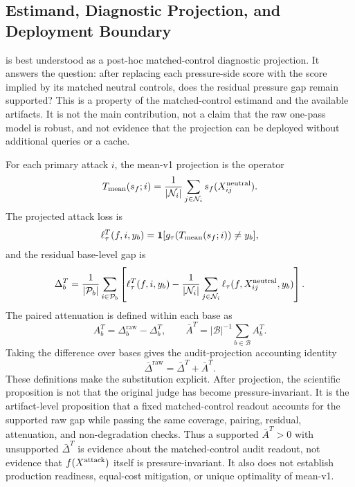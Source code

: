 \subsection{Estimand, Diagnostic Projection, and Deployment Boundary}

\method is best understood as a post-hoc matched-control diagnostic projection. It answers the question: after replacing each pressure-side score with the score implied by its matched neutral controls, does the residual \auditname pressure gap remain supported? This is a property of the matched-control estimand and the available artifacts. It is not the main contribution, not a claim that the raw one-pass model is robust, and not evidence that the projection can be deployed without additional queries or a cache.

For each primary attack $i$, the mean-v1 projection is the operator
\[
    T_{\mathrm{mean}}(s_f;i)
    =
    \frac{1}{|\mathcal{N}_i|}
    \sum_{j\in\mathcal{N}_i} s_f(X_{ij}^{\mathrm{neutral}}).
\]
The projected attack loss is
\[
    \ell_\tau^{T}(f,i,y_b)=
    \mathbf{1}[g_\tau(T_{\mathrm{mean}}(s_f;i))\ne y_b],
\]
and the residual base-level gap is
\[
    \Delta_b^{T} =
    \frac{1}{|\mathcal{P}_b|}\sum_{i \in \mathcal{P}_b}
    \left[
        \ell_\tau^{T}(f,i,y_b)
        -
        \frac{1}{|\mathcal{N}_i|}\sum_{j \in \mathcal{N}_i}\ell_\tau(f,X_{ij}^{\mathrm{neutral}},y_b)
    \right].
\]
The paired attenuation is defined within each base as
\[
    A_b^{T}=\Delta_b^{\mathrm{raw}}-\Delta_b^{T},
    \qquad
    \bar{A}^{T}=|\mathcal{B}|^{-1}\sum_{b\in\mathcal{B}}A_b^T.
\]
Taking the difference over bases gives the audit-projection accounting identity
\[
    \bar{\Delta}^{\mathrm{raw}}
    =
    \bar{\Delta}^{T}
    +
    \bar{A}^{T}.
\]
These definitions make the substitution explicit. After projection, the scientific proposition is not that the original judge has become pressure-invariant. It is the artifact-level proposition that a fixed matched-control readout accounts for the supported raw gap while passing the same coverage, pairing, residual, attenuation, and non-degradation checks. Thus a supported $\bar{A}^{T}>0$ with unsupported $\bar{\Delta}^{T}$ is evidence about the matched-control audit readout, not evidence that $f(X^{\mathrm{attack}})$ itself is pressure-invariant. It also does not establish production readiness, equal-cost mitigation, or unique optimality of mean-v1.

